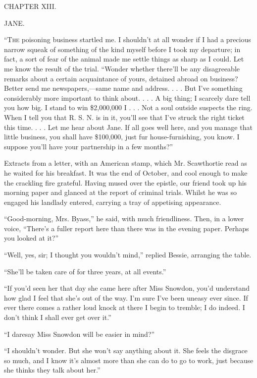 {}

{CHAPTER XIII.}

{JANE.}

\textsc{``The} poisoning business startled me. I shouldn't at all wonder
if I had a precious narrow squeak of something of the kind myself before
I took my departure; in fact, a sort of fear of the animal made me
settle things as sharp as I could. Let me know the result of the trial.
``Wonder whether there'll be any disagreeable remarks about a certain
acquaintance of yours, detained abroad on business? Better send me
newspapers,---same name and address. . . . But I've something
considerably more important to think about. . . . A big thing; I
scarcely dare tell you how big. I stand to win \$2,000,000 I . . . Not a
soul outside suspects the ring. When I tell you that R. S. N. is in it,
you'll see that I've struck the right ticket this time. . . . Let me
hear about Jane. If all goes well here, and you manage that little
business, you shall have \$100,000, just fur {}house-furnishing, you
know. I suppose you'll have your partnership in a few months?''

Extracts from a letter, with an American stamp, which Mr. Scawthortie
read as he waited for his breakfast. It was the end of October, and cool
enough to make the crackling fire grateful. Having mused over the
epistle, our friend took up his morning paper and glanced at the report
of criminal trials. Whilst he was so engaged his landlady entered,
carrying a tray of appetising appearance.

``Good-morning, Mrs. Byass,'' he said, with much friendliness. Then, in
a lower voice, ``There's a fuller report here than there was in the
evening paper. Perhaps you looked at it?''

``Well, yes, sir; I thought you wouldn't mind,'' replied Bessie,
arranging the table.

``She'll be taken care of for three years, at all events.''

``If you'd seen her that day she came here after Miss Snowdon, you'd
understand how glad I feel that she's out of the way. I'm sure I've been
uneasy ever since. If ever there comes a rather loud knock at there I
begin to tremble; I do indeed. I don't think I shall ever get over it.''

{}``I daresay Miss Snowdon will be easier in mind?''

``I shouldn't wonder. But she won't say anything about it. She feels the
disgrace so much, and I know it's almost more than she can do to go to
work, just because she thinks they talk about her.''

